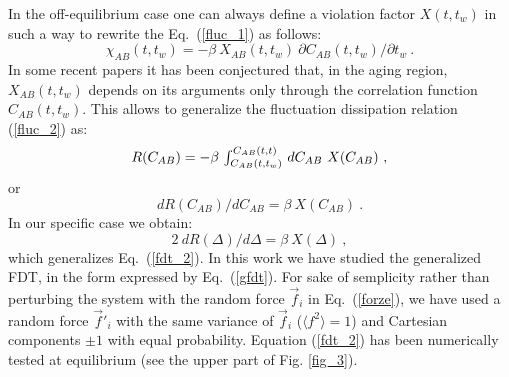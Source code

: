 In the off-equilibrium case one can always define
a violation factor $X(t,t_w)$ in such a way to rewrite the
Eq.~(\ref{fluc_1}) as follows:
\begin{equation}
\chi_{AB}(t,t_w)=-\beta \ X_{AB}(t,t_w)\
{\partial C_{AB}(t,t_w)}/{\partial t_w} \ .
\end{equation}
In some recent papers \cite{CUGLI} it has been conjectured that,
in the aging region, $X_{AB}(t,t_w)$ depends on its arguments only through
the correlation function $C_{AB}(t,t_w)$. This allows to generalize the
fluctuation dissipation relation (\ref{fluc_2}) as:
\begin{equation}
R(C_{AB})= -\beta \  \makebox{$\int_{C_{AB}(t,t_w)}^{C_{AB}(t,t)}$} \
 dC_{AB} \ X(C_{AB}) \ ,
\end{equation}
or
\begin{equation}
{dR(C_{AB})}/{dC_{AB}}=\beta\ X(C_{AB}) \ .
\end{equation}
In our specific case we obtain:
\begin{equation}
2\ {dR(\Delta)}/{d\Delta}=\beta\ X(\Delta) \ , \label{gfdt}
\end{equation}
which generalizes Eq.~(\ref{fdt_2}).
In this work we have studied the generalized FDT, in the form expressed by
Eq.~(\ref{gfdt}). 
For sake of semplicity rather than perturbing the system
with the random force  ${\vec f}_i$ in Eq.~(\ref{forze}),
we have used a random force ${\vec f'}_i$ with the same variance of ${\vec f}_i$
($\langle f^2 \rangle=1$) and Cartesian components  $\pm1$ with
equal probability.
Equation (\ref{fdt_2}) has been numerically tested at equilibrium
(see the upper part of Fig. \ref{fig_3}).
  
